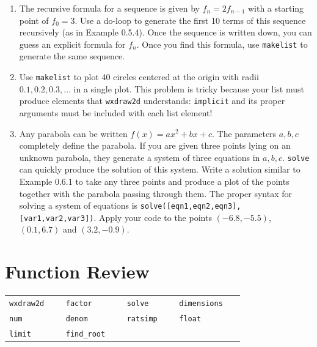 \documentclass[10.5pt,twoside]{report}
\theoremstyle{definition}
\begin{document}
\begin{enumerate}
\item  The recursive formula for a sequence is given by $f_n=2f_{n-1}$ with a starting point of $f_0=3$.  Use a do-loop to generate the first 10 terms of this sequence recursively (as in Example 0.5.4).  Once the sequence is written down, you can guess an explicit formula for $f_n$.  Once you find this formula, use \verb|makelist| to generate the same sequence.

\item Use \verb|makelist| to plot 40 circles centered at the origin with radii $0.1,0.2,0.3,\dots$ in a single plot.  This problem is tricky because your list must produce elements that \verb|wxdraw2d| understands:  \verb|implicit| and its proper arguments must be included with each list element!

\item Any parabola can be written $f(x)=ax^2+bx+c$.  The parameters $a,b,c$ completely define the parabola.  If you are given three points lying on an unknown parabola, they generate a system of three equations in $a,b,c$.  \verb|solve| can quickly produce the solution of this system.  Write a solution similar to Example 0.6.1 to take any three points and produce a plot of the points together with the parabola passing through them.  The proper syntax for solving a system of equations is \verb|solve([eqn1,eqn2,eqn3],[var1,var2,var3])|.  Apply your code to the points $(-6.8,-5.5)$, $(0.1,6.7)$ and $(3.2,-0.9)$.



\end{enumerate}


\pagebreak



\chapter{Function Review}

\vspace*{\fill}

\minitoc

\vspace*{\fill}



\newline
\newline

\begin{tabular}{l l l l}
 \verb|wxdraw2d   | &\verb|factor   |   &\verb|solve   | &\verb|dimensions   | \\
 \verb|num   |&\verb|denom   |   &\verb|ratsimp   |  &\verb|float   |\\
 \verb|limit   |&\verb|find_root   |   & \\
\end{tabular}
\end{document}
